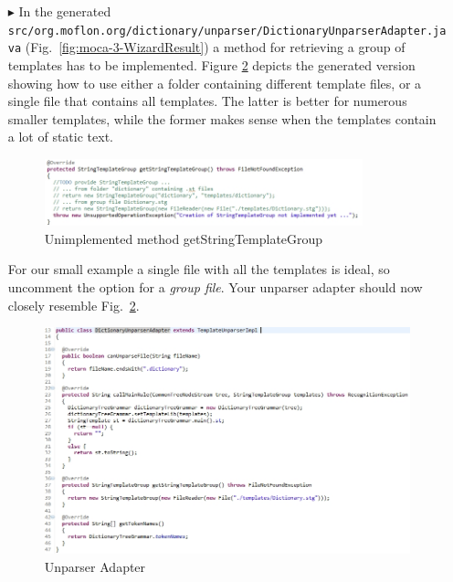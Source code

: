 \begin{enumerate}
\item[$\blacktriangleright$] In the generated \texttt{src/org.moflon.org/dictionary/unparser/Dic\-tion\-ary\-Unparser\-Adapter.java} (Fig.~\ref{fig:moca-3-WizardResult}) a method for retrieving a group of templates has to be implemented.
Figure \ref{fig:moca-DictionaryUnparserAdapter} depicts the generated version showing how to use either a folder containing different template files, or a single file that contains all templates.
The latter is better for numerous smaller templates, while the former makes sense when the templates contain a lot of static text.
\clearpage 
\begin{figure}[!htbp]
\begin{center}
 \includegraphics[width=0.87\textwidth]{pics/moca/5MocaTreeToText/UnparserAdapterNotImplemented}
  \caption{Unimplemented method getStringTemplateGroup} 
  \label{fig:moca-DictionaryUnparserAdapter}
\end{center}
\end{figure} 

For our small example a single file with all the templates is ideal, so uncomment the option for a \emph{group file}.
Your unparser adapter should now closely resemble Fig.~\ref{fig:moca-DictionaryUnparserAdapter}.  
 
\begin{figure}[!htbp]
\begin{center}
 \includegraphics[width=\textwidth]{pics/moca/5MocaTreeToText/UnparserAdapter}
  \caption{Unparser Adapter} 
  \label{fig:moca-DictionaryUnparserAdapter}
\end{center}
\end{figure} 


\end{enumerate}
